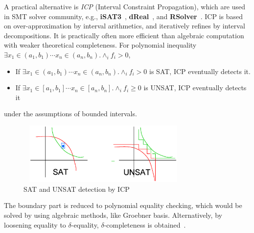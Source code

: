 \documentclass[runningheads,a4paper,oribibl]{llncs}
\begin{document}
A practical alternative is {\em ICP} (Interval Constraint Propagation), 
which are used in SMT solver community, e.g., {\bf iSAT3}~\cite{isat}, 
{\bf dReal}~\cite{dRealCADE13}, and \textbf{RSolver}~\cite{rsolver}. 
ICP is based on over-approximation by interval arithmetics, and iteratively refines by
interval decompositions. 
It is practically often more efficient than algebraic computation 
with weaker theoretical completeness. 
For polynomial inequality 
$\exists x_1 \in (a_1,b_1) \cdots x_n \in (a_n,b_n) . \wedge_{i} f_i > 0$, 
\begin{itemize}
\item If $\exists x_1 \in (a_1,b_1) \cdots x_n \in (a_n,b_n) . \wedge_{i} f_i > 0$ is SAT, 
ICP eventually detects it. 
\item If $\exists x_1 \in [a_1,b_1] \cdots x_n \in [a_n,b_n] . \wedge_{i} f_i \geq 0$ is UNSAT, 
ICP eventually detects it
\end{itemize}
under the assumptions of bounded intervals. 
\begin{figure}[ht]
\centering
\includegraphics[height=1.2in,width=3.4in]{FigCompleteness.eps} 
\caption{SAT and UNSAT detection by ICP} 
\label{fig:complete} 
\end{figure} 

The boundary part is reduced to polynomial equality checking, 
which would be solved by using algebraic methods, like Groebner basis. 
Alternatively, by loosening equality to $\delta$-equality, 
$\delta$-completeness is obtained~\cite{dRealCADE13}. 
\end{document}
